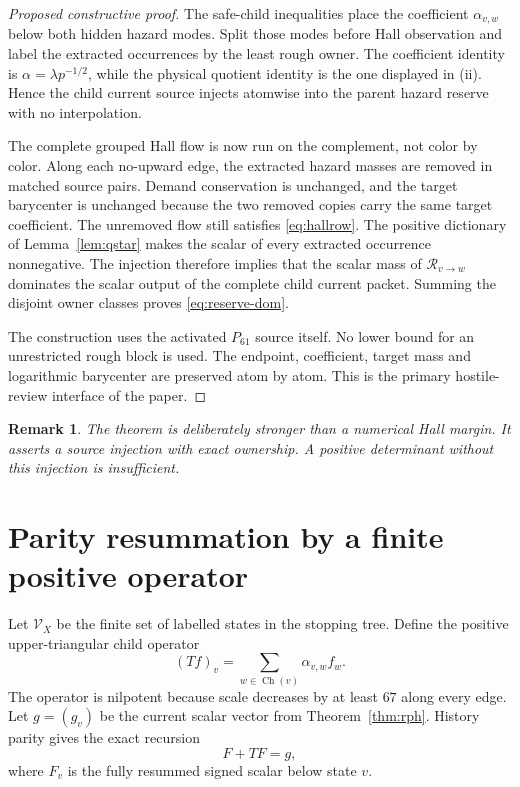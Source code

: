 \documentclass[11pt]{article}
\newtheorem{remark}[theorem]{Remark}
\newcommand{\Rcal}{\mathcal R}
\newcommand{\1}{\mathbf 1}
\begin{document}
\begin{proof}[Proposed constructive proof]
The safe-child inequalities place the coefficient $\alpha_{v,w}$ below both hidden hazard modes.  Split those modes before Hall observation and label the extracted occurrences by the least rough owner.  The coefficient identity is $\alpha=\lambda p^{-1/2}$, while the physical quotient identity is the one displayed in (ii).  Hence the child current source injects atomwise into the parent hazard reserve with no interpolation.

The complete grouped Hall flow is now run on the complement, not color by color.  Along each no-upward edge, the extracted hazard masses are removed in matched source pairs.  Demand conservation is unchanged, and the target barycenter is unchanged because the two removed copies carry the same target coefficient.  The unremoved flow still satisfies \eqref{eq:hallrow}.  The positive dictionary of Lemma~\ref{lem:qstar} makes the scalar of every extracted occurrence nonnegative.  The injection therefore implies that the scalar mass of $\Rcal_{v\to w}$ dominates the scalar output of the complete child current packet.  Summing the disjoint owner classes proves \eqref{eq:reserve-dom}.

The construction uses the activated $P_{61}$ source itself.  No lower bound for an unrestricted rough block is used.  The endpoint, coefficient, target mass and logarithmic barycenter are preserved atom by atom.  This is the primary hostile-review interface of the paper.
\end{proof}

\begin{remark}
The theorem is deliberately stronger than a numerical Hall margin.  It asserts a source injection with exact ownership.  A positive determinant without this injection is insufficient.
\end{remark}

\section{Parity resummation by a finite positive operator}

Let $\mathscr V_X$ be the finite set of labelled states in the stopping tree.  Define the positive upper-triangular child operator
\[
 (Tf)_v=\sum_{w\in\operatorname{Ch}(v)}\alpha_{v,w}f_w.
\]
The operator is nilpotent because scale decreases by at least $67$ along every edge.  Let $g=(g_v)$ be the current scalar vector from Theorem~\ref{thm:rph}.  History parity gives the exact recursion
\begin{equation}\label{eq:parityrec}
 F+TF=g,
\end{equation}
where $F_v$ is the fully resummed signed scalar below state $v$.
\end{document}
